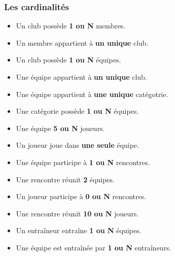 \documentclass{article}
\begin{document}
\subsubsection*{Les cardinalités}
\begin{itemize}
\item Un club possède \textbf{1 ou N} membres. \\

\item Un membre appartient à \textbf{un unique} club. \\

\item Un club possède \textbf{1 ou N} équipes. \\

\item Une équipe appartient à \textbf{un unique} club. \\

\item Une équipe appartient à \textbf{une unique} catégotrie. \\

\item Une catégorie possède \textbf{1 ou N} équipes. \\

\item Une équipe \textbf{5 ou N} joueurs. \\

\item Un joueur joue dans \textbf{une seule} équipe. \\

\item Une équipe participe à \textbf{1 ou N} rencontres. \\

\item Une rencontre réunit \textbf{2} équipes. \\

\item Un joueur participe à \textbf{0 ou N} rencontres. \\

\item Une rencontre réunit \textbf{10 ou N} joueurs. \\

\item Un entraîneur entraîne \textbf{1 ou N} équipes. \\

\item Une équipe est entraînée par \textbf{1 ou N} entraîneurs. \\
\end{itemize}
\end{document}

